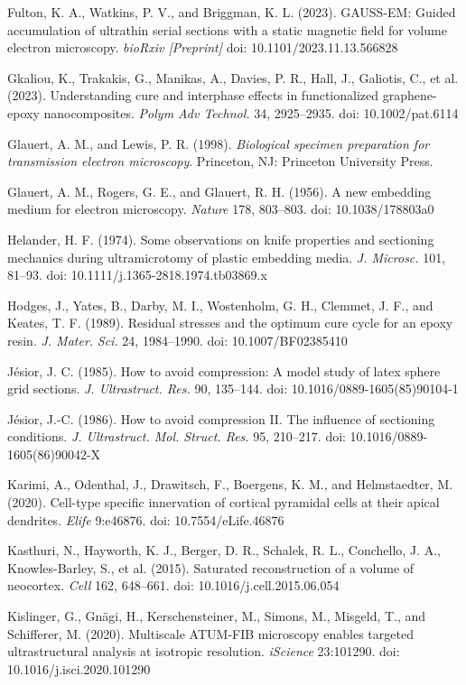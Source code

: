 \documentclass{article}
\newenvironment{reflist}{\par\small\setlength{\parindent}{0pt}\everypar{\hangindent=2.2em\hangafter=1}}{\par}
\begin{document}
\begin{reflist}
Fulton, K. A., Watkins, P. V., and Briggman, K. L. (2023). GAUSS-EM: Guided accumulation of ultrathin serial sections with a static magnetic field for volume electron microscopy. \emph{bioRxiv [Preprint]} doi: 10.1101/2023.11.13.566828

Gkaliou, K., Trakakis, G., Manikas, A., Davies, P. R., Hall, J., Galiotis, C., et al. (2023). Understanding cure and interphase effects in functionalized graphene-epoxy nanocomposites. \emph{Polym Adv Technol.} 34, 2925–2935. doi: 10.1002/pat.6114

Glauert, A. M., and Lewis, P. R. (1998). \emph{Biological specimen preparation for} \emph{transmission electron microscopy}. Princeton, NJ: Princeton University Press.

Glauert, A. M., Rogers, G. E., and Glauert, R. H. (1956). A new embedding medium for electron microscopy. \emph{Nature} 178, 803–803. doi: 10.1038/178803a0

Helander, H. F. (1974). Some observations on knife properties and sectioning mechanics during ultramicrotomy of plastic embedding media. \emph{J. Microsc.} 101, 81–93. doi: 10.1111/j.1365-2818.1974.tb03869.x

Hodges, J., Yates, B., Darby, M. I., Wostenholm, G. H., Clemmet, J. F., and Keates, T. F. (1989). Residual stresses and the optimum cure cycle for an epoxy resin. \emph{J. Mater.} \emph{Sci.} 24, 1984–1990. doi: 10.1007/BF02385410

Jésior, J. C. (1985). How to avoid compression: A model study of latex sphere grid sections. \emph{J. Ultrastruct. Res.} 90, 135–144. doi: 10.1016/0889-1605(85)90104-1

Jésior, J.-C. (1986). How to avoid compression II. The influence of sectioning conditions. \emph{J. Ultrastruct. Mol. Struct. Res.} 95, 210–217. doi: 10.1016/0889-1605(86)90042-X

Karimi, A., Odenthal, J., Drawitsch, F., Boergens, K. M., and Helmstaedter, M. (2020). Cell-type specific innervation of cortical pyramidal cells at their apical dendrites. \emph{Elife} 9:e46876. doi: 10.7554/eLife.46876

Kasthuri, N., Hayworth, K. J., Berger, D. R., Schalek, R. L., Conchello, J. A., Knowles-Barley, S., et al. (2015). Saturated reconstruction of a volume of neocortex. \emph{Cell} 162, 648–661. doi: 10.1016/j.cell.2015.06.054

Kislinger, G., Gnägi, H., Kerschensteiner, M., Simons, M., Misgeld, T., and Schifferer, M. (2020). Multiscale ATUM-FIB microscopy enables targeted ultrastructural analysis at isotropic resolution. \emph{iScience} 23:101290. doi: 10.1016/j.isci.2020.101290


\end{reflist}
\end{document}

